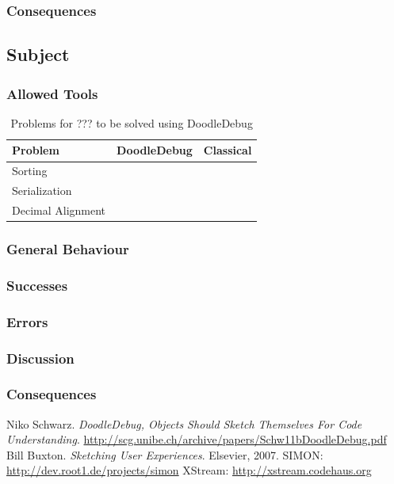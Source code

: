 \documentclass[a4paper,ngerman,english]{amsbook} %
\begin{document}
\subsubsection*{Consequences}

\subsection*{Subject}
\subsubsection*{Allowed Tools}
\begin{table}[h]
\centering
\begin{tabular}{l c c}
{\bf Problem} & {\bf DoodleDebug} & {\bf Classical} \\ \hline
Sorting &  &  \\
Serialization &  &  \\
Decimal Alignment &  &  \\
\end{tabular}
\caption{Problems for ??? to be solved using DoodleDebug}
\end{table}
\subsubsection*{General Behaviour}
\subsubsection*{Successes}
\subsubsection*{Errors}
\subsubsection*{Discussion}
\subsubsection*{Consequences}

\renewcommand\bibname{References} %
\begin{thebibliography}{99}
Niko Schwarz. \emph{DoodleDebug, Objects Should Sketch Themselves For Code Understanding}. \url{http://scg.unibe.ch/archive/papers/Schw11bDoodleDebug.pdf}
Bill Buxton. \emph{Sketching User Experiences}. Elsevier, 2007.
SIMON: \url{http://dev.root1.de/projects/simon}
XStream: \url{http://xstream.codehaus.org}
\end{thebibliography}
\end{document}
